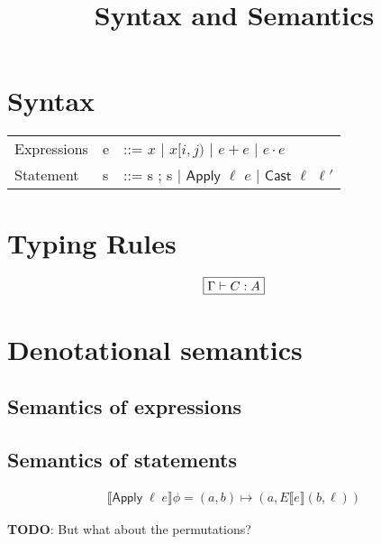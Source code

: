 \documentclass[runningheads]{llncs}
\newcommand {\ra} {\rightarrow}
\newcommand {\State} {\textsf{State}}
\newcommand {\Value} {\textsf{Value}}
\newcommand {\Locus} {\textsf{Locus}}
\newcommand {\Loc} {\textsf{Location}}
\newcommand {\sem} [1] {\llbracket #1 \rrbracket}
\newcommand {\Esem} [1] {E\sem{#1}}
\newcommand {\Expr} {\textsf{Expr}}
\newcommand {\Cmd} {\textsf{Stmt}}
\newcommand {\Apply} {\textsf{Apply}}
\newcommand {\Var} {\textsf{Var}}
\newcommand {\Index} {\textsf{Index}}
\newcommand {\Cast} {\textsf{Cast}}
\begin{document}
\title{Syntax and Semantics}
\author{}
\institute{}
\maketitle

\section{Syntax}

  \begin{tabular}{lll}
    Expressions\; & e & ::= $x$ $\mid$ $x[i,j)$ $\mid$ $e + e$ $\mid$ $e \cdot e$\\
    Statement\; & s & ::= s ; s $\mid$ $\Apply$ $\ell$ $e$ $\mid$ $\Cast$ $\ell$ $\ell'$
  \end{tabular}


\section{Typing Rules}

\[
  \begin{array}{c}
    \fbox{$\Gamma \vdash C : A$}
  \end{array}
\]

\section{Denotational semantics}
    \fbox{
      \begin{minipage}{\textwidth}
      \[
      \begin{array}{ll}
                \Esem{\cdot} &{}: \Expr \ra ((\Value \times \Locus) \ra \State)\\
                \sem{\cdot} &{}: \Cmd \ra (\State \ra \State)\\
                \State &{}= \Loc \ra \Value\\
                \Loc &{}= \Var \times \Index
          \end{array}
        \]
      \end{minipage}
}

\subsection{Semantics of expressions}

\subsection{Semantics of statements}

\[
  \begin{array}{c}
      \sem{\Apply\;\ell\;e}\phi = (a, b) \mapsto
               (a, \Esem{e}(b, \ell))
  \end{array}
\]

\textbf{TODO}: But what about the permutations?
\end{document}
